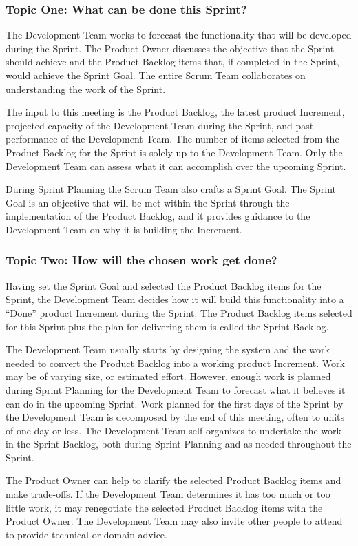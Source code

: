 \subsubsection{Topic One: What can be done this Sprint?}
The Development Team works to forecast the functionality that will be developed during the
Sprint. The Product Owner discusses the objective that the Sprint should achieve and the
Product Backlog items that, if completed in the Sprint, would achieve the Sprint Goal. The entire
Scrum Team collaborates on understanding the work of the Sprint.

The input to this meeting is the Product Backlog, the latest product Increment, projected
capacity of the Development Team during the Sprint, and past performance of the Development
Team. The number of items selected from the Product Backlog for the Sprint is solely up to the
Development Team. Only the Development Team can assess what it can accomplish over the
upcoming Sprint.

During Sprint Planning the Scrum Team also crafts a Sprint Goal. The Sprint Goal is an objective
that will be met within the Sprint through the implementation of the Product Backlog, and it
provides guidance to the Development Team on why it is building the Increment.

\subsubsection{Topic Two: How will the chosen work get done?}
Having set the Sprint Goal and selected the Product Backlog items for the Sprint, the
Development Team decides how it will build this functionality into a ``Done'' product Increment
during the Sprint. The Product Backlog items selected for this Sprint plus the plan for delivering
them is called the Sprint Backlog.

The Development Team usually starts by designing the system and the work needed to convert
the Product Backlog into a working product Increment. Work may be of varying size, or
estimated effort. However, enough work is planned during Sprint Planning for the Development
Team to forecast what it believes it can do in the upcoming Sprint. Work planned for the first
days of the Sprint by the Development Team is decomposed by the end of this meeting, often to
units of one day or less. The Development Team self-organizes to undertake the work in the
Sprint Backlog, both during Sprint Planning and as needed throughout the Sprint.

The Product Owner can help to clarify the selected Product Backlog items and make trade-offs.
If the Development Team determines it has too much or too little work, it may renegotiate the
selected Product Backlog items with the Product Owner. The Development Team may also invite
other people to attend to provide technical or domain advice.

